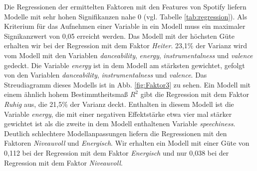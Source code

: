 Die Regressionen der ermittelten Faktoren mit den Features von Spotify liefern Modelle mit sehr hohen Signifikanzen nahe 0 (vgl. Tabelle \ref{tab:regression}).
Als Kriterium für das Aufnehmen einer Variable in ein Modell muss ein maximaler Signikanzwert von 0,05 erreicht werden.  
Das Modell mit der höchsten Güte erhalten wir bei der Regression mit dem Faktor \textit{Heiter}.
23,1\% der Varianz wird vom Modell mit den Variablen \textit{danceability}, \textit{energy}, \textit{instrumentalness} und \textit{valence} gedeckt.
Die Variable \textit{energy} ist in dem Modell am stärksten gewichtet, gefolgt von den Variablen \textit{danceability},  \textit{instrumentalness} und \textit{valence}.
Das Streudiagramm dieses Modells ist in Abb. \ref{fig:Faktor3} zu sehen.    
Ein Modell mit einem ähnlich hohem Bestimmtheitsmaß $R^2$ gibt die Regression mit dem Faktor \textit{Ruhig} aus, die 21,5\% der Varianz deckt.
Enthalten in diesem Modell ist die Variable \textit{energy}, die mit einer negativen Effektstärke etwa vier mal stärker gewichtet ist als die zweite in dem Modell enthaltenen Variable \textit{speechiness}.
Deutlich schlechtere Modellanpassungen liefern die Regressionen mit den Faktoren \textit{Niveauvoll} und \textit{Energisch}.
Wir erhalten ein Modell mit einer Güte von 0,112 bei der Regression mit dem Faktor \textit{Energisch} und nur 0,038 bei der Regression mit dem Faktor \textit{Niveauvoll}.

